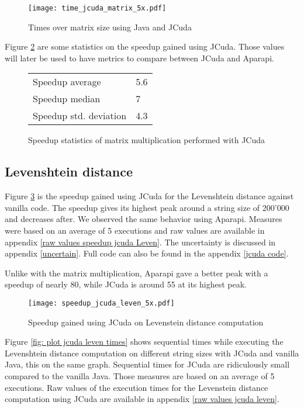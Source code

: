 \begin{figure}[H]
\centering
\texttt{[image: time\_jcuda\_matrix\_5x.pdf]}
\caption{Times over matrix size using Java and JCuda}
\label{fig: plot jcuda matrix times}
\end{figure}

Figure \ref{fig table matrix jcuda} are some statistics on the speedup gained using JCuda. Those values will later be used to have metrics to compare between JCuda and Aparapi.

\begin{figure}[H]
\begin{center}
\begin{tabular}{ |l|l| } 
 \hline
 Speedup average & 5.6 \\ 
 Speedup median & 7 \\ 
 Speedup std. deviation & 4.3 \\ 
 \hline
\end{tabular}
\end{center}
\caption{Speedup statistics of matrix multiplication performed with JCuda}
\label{fig table matrix jcuda}
\end{figure}

\subsection{Levenshtein distance}

Figure \ref{fig plot leven jcuda} is the speedup gained using JCuda for the Levenshtein distance against vanilla code. The speedup gives its highest peak around a string size of 200'000 and decreases after. We observed the same behavior using Aparapi. Measures were based on an average of 5 executions and raw values are available in appendix \ref{raw values speedup jcuda Leven}. The uncertainty is discussed in appendix \ref{uncertain}. Full code can also be found in the appendix \ref{jcuda code}.

Unlike with the matrix multiplication, Aparapi gave a better peak with a speedup of nearly 80, while JCuda is around 55 at its highest peak.

\begin{figure}[H]
\centering
\texttt{[image: speedup\_jcuda\_leven\_5x.pdf]}
\caption{Speedup gained using JCuda on Levenstein distance computation}
\label{fig plot leven jcuda}
\end{figure}

Figure \ref{fig: plot jcuda leven times} shows sequential times while executing the Levenshtein distance computation on different string sizes with JCuda and  vanilla Java, this on the same graph. Sequential times for JCuda are ridiculously small compared to the vanilla Java. Those measures are based on an average of 5 executions. Raw values of the execution times for the Levenstein distance computation using JCuda are available in appendix \ref{raw values jcuda leven}.

